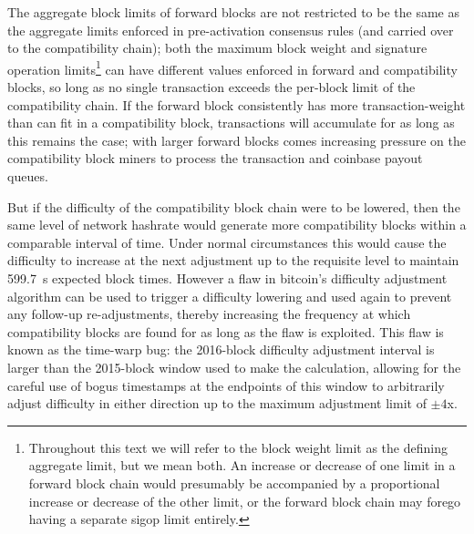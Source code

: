 The aggregate block limits of forward blocks are not restricted to be
the same as the aggregate limits enforced in pre-activation consensus
rules (and carried over to the compatibility chain); both the maximum
block weight and signature operation limits\footnote{Throughout this
text we will refer to the block weight limit as the defining aggregate
limit, but we mean both.  An increase or decrease of one limit in a
forward block chain would presumably be accompanied by a proportional
increase or decrease of the other limit, or the forward block chain
may forego having a separate sigop limit entirely.} can have different
values enforced in forward and compatibility blocks, so long as no
single transaction exceeds the per-block limit of the compatibility
chain.  If the forward block consistently has more transaction-weight
than can fit in a compatibility block, transactions will accumulate
for as long as this remains the case; with larger forward blocks comes
increasing pressure on the compatibility block miners to process the
transaction and coinbase payout queues.

But if the difficulty of the compatibility block chain were to be
lowered, then the same level of network hashrate would generate more
compatibility blocks within a comparable interval of time.  Under
normal circumstances this would cause the difficulty to increase at
the next adjustment up to the requisite level to
maintain \SI{599.7}{\second} expected block times.  However a flaw in
bitcoin's difficulty adjustment algorithm can be used to trigger a
difficulty lowering and used again to prevent any follow-up
re-adjustments, thereby increasing the frequency at which
compatibility blocks are found for as long as the flaw is exploited.
This flaw is known as the time-warp bug: the
\num{2016}-block difficulty adjustment interval is larger than the
\num{2015}-block window used to make the calculation,\footnotemark
allowing for the careful use of bogus timestamps at the endpoints of
this window to arbitrarily adjust difficulty in either direction up to
the maximum adjustment limit of $\pm 4$x.


